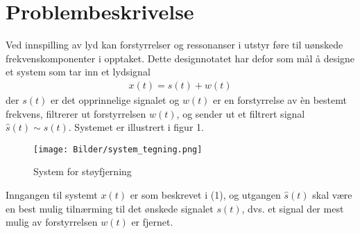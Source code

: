 \section{Problembeskrivelse}
\label{problemBeskrivelse}

Ved innspilling av lyd kan forstyrrelser og ressonanser i utstyr føre til uønskede frekvenskomponenter i opptaket. 
Dette designnotatet har defor som mål å designe et system som tar inn et lydsignal 
\begin{align}
    x(t) = s(t) + w(t)
\end{align}
der $s(t)$ er det opprinnelige signalet og $w(t)$ er en forstyrrelse av èn bestemt frekvens, filtrerer ut forstyrrelsen $w(t)$, 
og sender ut et filtrert signal $\hat{s}(t) \sim s(t)$. Systemet er illustrert i figur 1.

\begin{figure}[H]
    \centering
    \texttt{[image: Bilder/system\_tegning.png]}
    \caption{System for støyfjerning}
\end{figure}

Inngangen til systemt $x(t)$ er som beskrevet i (1), og utgangen $\hat{s}(t)$ skal være en best mulig tilnærming til det ønskede signalet $s(t)$, 
dvs. et signal der mest mulig av forstyrrelsen $w(t)$ er fjernet.
